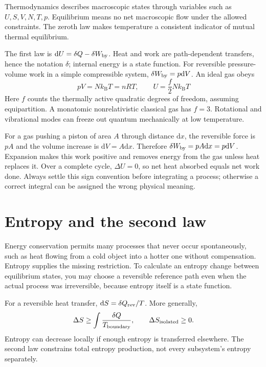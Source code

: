\documentclass[11pt,oneside]{book}
\newcommand{\dd}{\mathrm{d}}
\newcommand{\kb}{k_{\mathrm B}}
\theoremstyle{reviewstyle}
\begin{document}
Thermodynamics describes macroscopic states through variables such as $U,S,V,N,T,p$. Equilibrium means no net macroscopic flow under the allowed constraints. The zeroth law makes temperature a consistent indicator of mutual thermal equilibrium.

The first law is $\dd U=\delta Q-\delta W_{\rm by}$. Heat and work are path-dependent transfers, hence the notation $\delta$; internal energy is a state function. For reversible pressure-volume work in a simple compressible system, $\delta W_{\rm by}=p\dd V$. An ideal gas obeys
\begin{equation}pV=N\kb T=nRT,\qquad U=\frac f2N\kb T\end{equation}
Here $f$ counts the thermally active quadratic degrees of freedom, assuming equipartition. A monatomic nonrelativistic classical gas has $f=3$. Rotational and vibrational modes can freeze out quantum mechanically at low temperature.

For a gas pushing a piston of area $A$ through distance $\dd x$, the reversible force is $pA$ and the volume increase is $\dd V=A\dd x$. Therefore $\delta W_{\rm by}=pA\dd x=p\dd V$. Expansion makes this work positive and removes energy from the gas unless heat replaces it. Over a complete cycle, $\Delta U=0$, so net heat absorbed equals net work done. Always settle this sign convention before integrating a process; otherwise a correct integral can be assigned the wrong physical meaning.

\section{Entropy and the second law}
Energy conservation permits many processes that never occur spontaneously, such as heat flowing from a cold object into a hotter one without compensation. Entropy supplies the missing restriction. To calculate an entropy change between equilibrium states, you may choose a reversible reference path even when the actual process was irreversible, because entropy itself is a state function.

For a reversible heat transfer, $\dd S=\delta Q_{\rm rev}/T$. More generally,
\begin{equation}\Delta S\geq\int\frac{\delta Q}{T_{\rm boundary}},\qquad \Delta S_{\rm isolated}\geq0.\end{equation}
Entropy can decrease locally if enough entropy is transferred elsewhere. The second law constrains total entropy production, not every subsystem's entropy separately.
\end{document}
